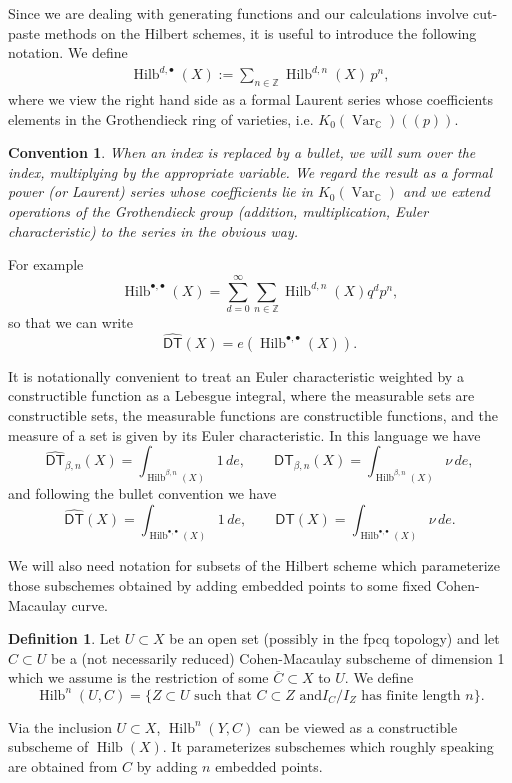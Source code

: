 \documentclass{amsart}
\newtheorem{convention}{Convention}[theorem]
\theoremstyle{definition}
\newtheorem{definition}[theorem]{Definition}
\newcommand{\CC} {\mathbb{C}}          %
\newcommand{\ZZ} {\mathbb{Z}}		%
\newcommand{\Hilb}{\operatorname{Hilb}}
\newcommand{\DT}{\mathsf{DT}}
\newcommand{\Var}{\operatorname{Var}}
\newcommand{\DThat}{\widehat{\DT}}
\begin{document}
Since we are dealing with generating functions and our calculations
involve cut-paste methods on the Hilbert schemes, it is useful to
introduce the following notation. We define
\begin{align*}
\Hilb^{d,\bullet}(X) := \sum_{n \in \ZZ} \Hilb^{d,n}(X) \, p^n,
\end{align*}
where we view the right hand side as a formal Laurent series whose
coefficients elements in the Grothendieck ring of varieties,
i.e. $K_0(\Var_{\CC})(\!(p)\!)$.



\begin{convention}\label{conv: bullet convention}
When an index is replaced by a bullet, we will sum over the index,
multiplying by the appropriate variable. We regard the result as a
formal power (or Laurent) series whose coefficients lie in
$K_{0}(\Var_{\CC})$ and we extend operations of the Grothendieck group
(addition, multiplication, Euler characteristic) to the series in the
obvious way.
\end{convention}

For example
\[
\Hilb^{\bullet ,\bullet}(X) = \sum_{d=0}^{\infty}\sum_{n\in \ZZ}
\Hilb^{d,n}(X) q^{d}p^{n},
\]
so that we can write
\[
\DThat (X) = e(\Hilb^{\bullet ,\bullet}(X)).
\]

It is notationally convenient to treat an Euler characteristic
weighted by a constructible function as a Lebesgue integral, where the
measurable sets are constructible sets, the measurable functions are
constructible functions, and the measure of a set is given by its
Euler characteristic. In this language we have
\[
\DThat_{\beta ,n}(X) =  \int_{\Hilb^{\beta ,n}(X)} 1\, de, \quad \quad
\DT_{\beta ,n}(X) = \int_{\Hilb^{\beta ,n}(X)} \nu \, de,
\]
and following the bullet convention we have
\[
\DThat(X) =  \int_{\Hilb^{\bullet ,\bullet }(X)} 1\, de, \quad \quad
\DT(X) = \int_{\Hilb^{\bullet ,\bullet }(X)} \nu \, de.
\]

We will also need notation for subsets of the Hilbert scheme which
parameterize those subschemes obtained by adding embedded points to
some fixed Cohen-Macaulay curve.

\begin{definition}\label{defn: Hilb(U,C)}
Let $U\subset X$ be an open set (possibly in the fpcq topology) and
let $C\subset U$ be a (not necessarily reduced)
Cohen-Macaulay subscheme of dimension 1 which we assume is the
restriction of some $\overline{C}\subset X$ to $U$. We define 
\[
\Hilb^{n}(U,C) = \{Z\subset U\text{ such that }C\subset Z\text{ and
$I_{C}/I_{Z}$ has finite length $n$} \}.
\]
\end{definition}
Via the inclusion $U\subset X$, $\Hilb^{n}(Y,C)$ can be viewed as a
constructible subscheme of $\Hilb (X)$. It parameterizes subschemes
which roughly speaking are obtained from $C$ by adding $n$ embedded
points.
\end{document}
